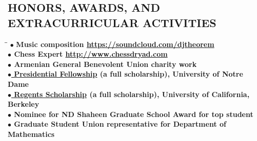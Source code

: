 \documentclass{resume}
\begin{document}
\begin{resume}
    \section{HONORS, AWARDS, AND EXTRACURRICULAR ACTIVITIES} 
    \vspace{-0.1in}
    \begin{tabbing}
        \hspace{2.3in}\= \hspace{2.6in}\= \kill
        $\bullet$ \bf Music composition
        \href{https://soundcloud.com/djtheorem}{https://soundcloud.com/djtheorem}
        \\
        $\bullet$ \textbf{Chess Expert \href{http://www.chessdryad.com/articles/mi/article_165.htm}{http://www.chessdryad.com}} 
        \\
        $\bullet$ \textbf{Armenian General Benevolent Union charity work} \\
        \href{http://graduateschool.nd.edu/admissions/financial-support/prestigious-fellowships/presidential-fellowships-arthur-j-schmitt-fellowships/}{$\bullet$ Presidential
        Fellowship} (a full scholarship), University of Notre Dame  \\
        \href{http://students.berkeley.edu/finaid/undergraduates/types_regents.htm}{$\bullet$ Regents
        Scholarship} (a full scholarship), University of California, 
        Berkeley  \\
        $\bullet$ Nominee for ND Shaheen Graduate School Award for top student
        \\
        $\bullet$ Graduate Student Union representative for Department of Mathematics \\
    \end{tabbing}

\end{resume}
\end{document}
